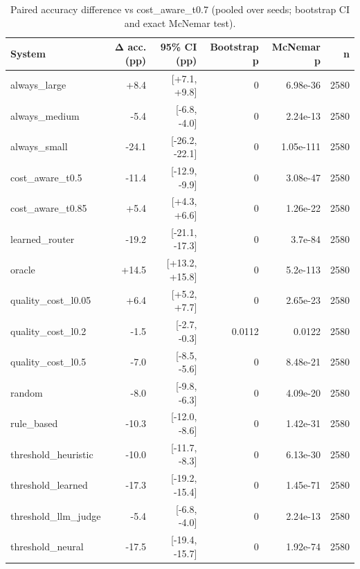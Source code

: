 \begin{table}[t]
\centering
\small
\caption{Paired accuracy difference vs cost\_aware\_t0.7 (pooled over seeds; bootstrap CI and exact McNemar test).}
\label{tab:significance}
\begin{tabular}{lrrrrr}
\toprule
System & Δ acc. (pp) & 95\% CI (pp) & Bootstrap p & McNemar p & n \\
\midrule
always\_large & +8.4 & [+7.1, +9.8] & 0 & 6.98e-36 & 2580 \\
always\_medium & -5.4 & [-6.8, -4.0] & 0 & 2.24e-13 & 2580 \\
always\_small & -24.1 & [-26.2, -22.1] & 0 & 1.05e-111 & 2580 \\
cost\_aware\_t0.5 & -11.4 & [-12.9, -9.9] & 0 & 3.08e-47 & 2580 \\
cost\_aware\_t0.85 & +5.4 & [+4.3, +6.6] & 0 & 1.26e-22 & 2580 \\
learned\_router & -19.2 & [-21.1, -17.3] & 0 & 3.7e-84 & 2580 \\
oracle & +14.5 & [+13.2, +15.8] & 0 & 5.2e-113 & 2580 \\
quality\_cost\_l0.05 & +6.4 & [+5.2, +7.7] & 0 & 2.65e-23 & 2580 \\
quality\_cost\_l0.2 & -1.5 & [-2.7, -0.3] & 0.0112 & 0.0122 & 2580 \\
quality\_cost\_l0.5 & -7.0 & [-8.5, -5.6] & 0 & 8.48e-21 & 2580 \\
random & -8.0 & [-9.8, -6.3] & 0 & 4.09e-20 & 2580 \\
rule\_based & -10.3 & [-12.0, -8.6] & 0 & 1.42e-31 & 2580 \\
threshold\_heuristic & -10.0 & [-11.7, -8.3] & 0 & 6.13e-30 & 2580 \\
threshold\_learned & -17.3 & [-19.2, -15.4] & 0 & 1.45e-71 & 2580 \\
threshold\_llm\_judge & -5.4 & [-6.8, -4.0] & 0 & 2.24e-13 & 2580 \\
threshold\_neural & -17.5 & [-19.4, -15.7] & 0 & 1.92e-74 & 2580 \\
\bottomrule
\end{tabular}
\end{table}

